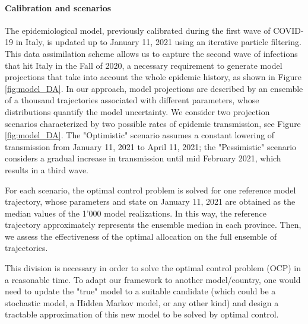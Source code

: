 \paragraph{Calibration and scenarios}The epidemiological model, previously calibrated during the first wave of COVID-19 in Italy\cite{Gatto:SpreadDynamicsCOVID19:2020,Bertuzzo:GeographyCOVID19Spread:2020}, is updated up to January 11, 2021 using an iterative particle filtering. This data assimilation scheme allows us to capture the second wave of infections that hit Italy in the Fall of 2020, a necessary requirement to generate model projections that take into account the whole epidemic history, as shown in Figure \ref{fig:model_DA}. In our approach, model projections are described by an ensemble of a thousand trajectories associated with different parameters, whose distributions quantify the model uncertainty. 
We consider two projection scenarios characterized by two possible rates of epidemic transmission, see Figure \ref{fig:model_DA}. The "Optimistic" scenario assumes a constant lowering of transmission from January 11, 2021 to April 11, 2021; the "Pessimistic" scenario considers a gradual increase in transmission until mid February 2021, which results in a third wave. 

For each scenario, the optimal control problem is solved for one reference model trajectory, whose parameters and state on January 11, 2021 are obtained as the median values of the 1'000 model realizations. In this way, the reference trajectory approximately represents the ensemble median in each province. Then, we assess the effectiveness of the optimal allocation on the full ensemble of trajectories.



This division is necessary in order to solve the optimal control problem (OCP) in a reasonable time. To adapt our framework to another model/country, one would need to update the "true" model to a suitable candidate (which could be a stochastic model, a Hidden Markov model, or any other kind) and design a tractable approximation of this new model to be solved by optimal control.

